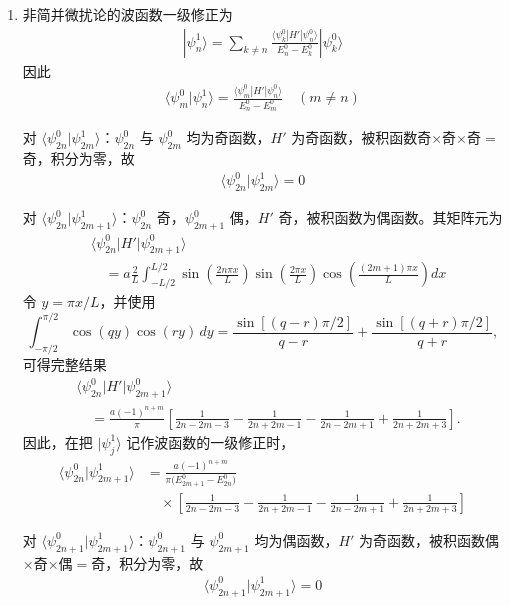 \begin{enumerate}
{\begin{enumerate}
	\item 非简并微扰论的波函数一级修正为
	\begin{align*}
		|\psi_n^1\rangle=\sum_{k\neq n}\frac{\langle\psi_k^0|H'|\psi_n^0\rangle}{E_n^0-E_k^0}|\psi_k^0\rangle
	\end{align*}
	因此
	\begin{align*}
		\langle\psi_m^0|\psi_n^1\rangle=\frac{\langle\psi_m^0|H'|\psi_n^0\rangle}{E_n^0-E_m^0}\quad(m\neq n)
	\end{align*}
	
	对 $\langle\psi_{2n}^0|\psi_{2m}^1\rangle$：$\psi_{2n}^0$ 与 $\psi_{2m}^0$ 均为奇函数，$H'$ 为奇函数，被积函数奇$\times$奇$\times$奇$=$奇，积分为零，故
	\begin{align*}
		\langle\psi_{2n}^0|\psi_{2m}^1\rangle=0
	\end{align*}
	
		对 $\langle\psi_{2n}^0|\psi_{2m+1}^1\rangle$：$\psi_{2n}^0$ 奇，$\psi_{2m+1}^0$ 偶，$H'$ 奇，被积函数为偶函数。其矩阵元为
	\begin{align*}
		&\langle\psi_{2n}^0|H'|\psi_{2m+1}^0\rangle\\
		&\quad=a\frac{2}{L}\int_{-L/2}^{L/2}\sin\!\left(\frac{2n\pi x}{L}\right)\sin\!\left(\frac{2\pi x}{L}\right)\cos\!\left(\frac{(2m+1)\pi x}{L}\right)dx
	\end{align*}
		令 $y=\pi x/L$，并使用
		\[
		\int_{-\pi/2}^{\pi/2}\cos(qy)\cos(ry)\,dy
		=\frac{\sin[(q-r)\pi/2]}{q-r}
		 +\frac{\sin[(q+r)\pi/2]}{q+r},
		\]
		可得完整结果
		\begin{align*}
		&\langle\psi_{2n}^0|H'|\psi_{2m+1}^0\rangle\\
		&\quad=\frac{a(-1)^{n+m}}{\pi}
		\left[
		\frac{1}{2n-2m-3}-\frac{1}{2n+2m-1}
		-\frac{1}{2n-2m+1}+\frac{1}{2n+2m+3}
		\right].
		\end{align*}
		因此，在把 $|\psi_j^1\rangle$ 记作波函数的一级修正时，
		\[
		\boxed{\begin{aligned}
		\langle\psi_{2n}^0|\psi_{2m+1}^1\rangle
		&=\frac{a(-1)^{n+m}}{\pi\bigl(E_{2m+1}^0-E_{2n}^0\bigr)}\\
		&\quad\times\left[
		\frac{1}{2n-2m-3}-\frac{1}{2n+2m-1}
		-\frac{1}{2n-2m+1}+\frac{1}{2n+2m+3}
		\right]
		\end{aligned}}
		\]
	
	对 $\langle\psi_{2n+1}^0|\psi_{2m+1}^1\rangle$：$\psi_{2n+1}^0$ 与 $\psi_{2m+1}^0$ 均为偶函数，$H'$ 为奇函数，被积函数偶$\times$奇$\times$偶$=$奇，积分为零，故
	\begin{align*}
		\langle\psi_{2n+1}^0|\psi_{2m+1}^1\rangle=0
	\end{align*}
\end{enumerate}
}



\end{enumerate}
